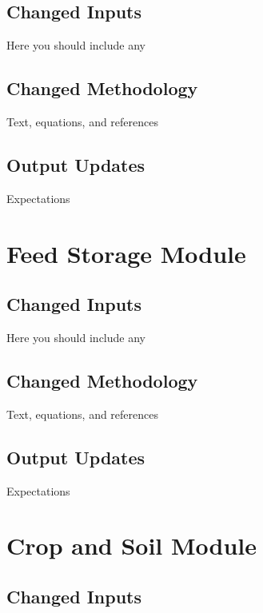 \documentclass[
  letterpaper,
  oneside,
  openany]{scrbook}
\begin{document}
\subsection{Changed Inputs}\label{changed-inputs-1}

Here you should include any

\subsection{Changed Methodology}\label{changed-methodology-1}

Text, equations, and references

\subsection{Output Updates}\label{output-updates-1}

Expectations

\section{Feed Storage Module}\label{feed-storage-module}

\subsection{Changed Inputs}\label{changed-inputs-2}

Here you should include any

\subsection{Changed Methodology}\label{changed-methodology-2}

Text, equations, and references

\subsection{Output Updates}\label{output-updates-2}

Expectations

\section{Crop and Soil Module}\label{crop-and-soil-module}

\subsection{Changed Inputs}\label{changed-inputs-3}
\end{document}
